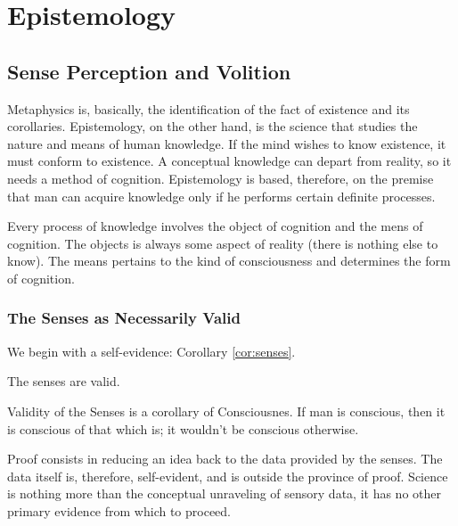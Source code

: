 \part{Epistemology}

\chapter{Sense Perception and Volition}

    Metaphysics is, basically, the identification of the fact of existence and its corollaries. Epistemology, on the other hand, is the science that studies the nature and means of human knowledge. If the mind wishes to know existence, it must conform to existence. A conceptual knowledge can depart from reality, so it needs a method of cognition. Epistemology is based, therefore, on the premise that man can acquire knowledge only if he performs certain definite processes.

    Every process of knowledge involves the object of cognition and the mens of cognition. The objects is always some aspect of reality (there is nothing else to know). The means pertains to the kind of consciousness and determines the form of cognition.
    
    \section{The Senses as Necessarily Valid}
    
        We begin with a self-evidence: Corollary \ref{cor:senses}.

            \begin{corollary}
            \label{cor:senses}
                The senses are valid.
            \end{corollary}

            \begin{remark}
                Validity of the Senses is a corollary of Consciousnes. If man is conscious, then it is conscious of that which is; it wouldn't be conscious otherwise.
            \end{remark}
        
        Proof consists in reducing an idea back to the data provided by the senses. The data itself is, therefore, self-evident, and is outside the province of proof. Science is nothing more than the conceptual unraveling of sensory data, it has no other primary evidence from which to proceed.
        
